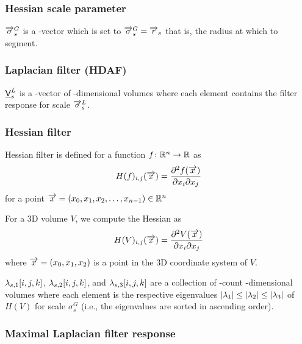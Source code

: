 \documentclass[12pt]{article}
\begin{document}
\subsubsection{Hessian scale parameter}

\(\overrightarrow{\sigma}^{G}_{s}\) is a \Dim{\RadiiScalesName}-vector which is set to
\(\overrightarrow{\sigma}^{G}_{s} = \overrightarrow{r}_{s}{}\) that is, the radius at which to segment.

\subsubsection{Laplacian filter (HDAF)}

\(\mathsf{\underline{V}}^{L}_{s}\) is a \Dim{\RadiiScalesName}-vector of
\Dim{\InputVolumeName}-dimensional volumes where each element
contains the filter response for scale \(\overrightarrow{\sigma}^{L}_{s}\).

\subsubsection{Hessian filter}


Hessian filter is defined for a function \(f\colon \mathbb{R}^{n} \to \mathbb{R}\)
as
\begin{dmath*}
	H(f)_{i,j}(\vect{x}) = \frac{\partial{}^{2} f(\vect{x})}{\partial{}x_{i}\partial{}x_{j}}
\end{dmath*}
for a point \(\overrightarrow{x} = (x_0, x_1, x_2, \dotsc, x_{n-1}) \in \mathbb{R}^{n}\)

For a 3D volume \(V\), we compute the Hessian as
\begin{dmath*}
	H(V)_{i,j}(\vect{x}) = \frac{\partial{}^{2} V(\vect{x})}{\partial{}x_{i}\partial{}x_{j}}
\end{dmath*}
where \(\overrightarrow{x} = (x_{0}, x_{1}, x_{2})\) is a point in the 3D
coordinate system of \(V\).


\(\lambda_{s,1}[i,j,k]\),
\(\lambda_{s,2}[i,j,k]\), and
\(\lambda_{s,3}[i,j,k]\) are
a collection of \Dim{\RadiiScalesName}-count
\Dim{\InputVolumeName}-dimensional volumes where each element is
the respective eigenvalues \(\left| \lambda_1 \right| \le \left| \lambda_2 \right| \le \left| \lambda_3 \right|\)
of \(H(V)\) for scale \(\sigma^{G}_{s}\) (i.e., the eigenvalues are sorted in ascending
order).

\subsubsection{Maximal Laplacian filter response}
\end{document}
